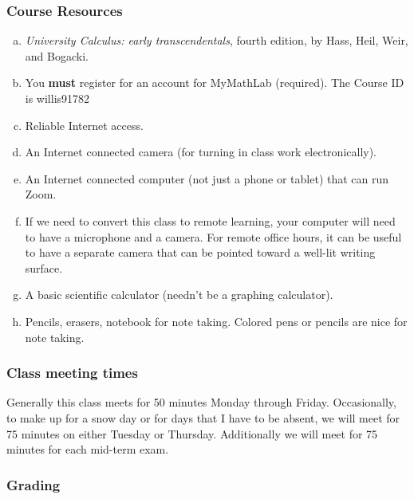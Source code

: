 \documentclass[12pt,fullpage]{article}
\newcounter{ex}\setcounter{ex}{0}
\newenvironment{alphalist}{
  \begin{enumerate}[(a)]
    \addtolength{\itemsep}{-0.5\itemsep}}
  {\end{enumerate}}
\begin{document}
\subsubsection*{Course Resources}

\begin{alphalist}

\item \emph{University Calculus: early transcendentals}, fourth edition, by Hass,  Heil, Weir, and Bogacki.


\item You \textbf{must} register for an account for MyMathLab  (required).  The Course ID is willis91782 

\item Reliable Internet access.

\item An Internet connected camera (for turning in class work electronically).

\item  An Internet connected computer (not just a phone or tablet) that can run Zoom. 

\item If we need to convert this class to remote learning, your computer will need to have a microphone and a camera. For remote office hours, it can be useful to have a separate camera that can be pointed toward a well-lit writing surface.

\item A basic scientific calculator (needn't be a graphing calculator).

\item Pencils, erasers, notebook for note taking. Colored pens or pencils are nice for note taking.

\end{alphalist}

\subsubsection*{Class meeting times}

Generally this  class meets for 50 minutes Monday through Friday. Occasionally, to make up for a snow day or for days that I have to be absent,  we will meet for 75 minutes on 
either Tuesday or Thursday. Additionally we will meet for 75 minutes for each mid-term exam. 

\subsubsection*{Grading}
\end{document}
